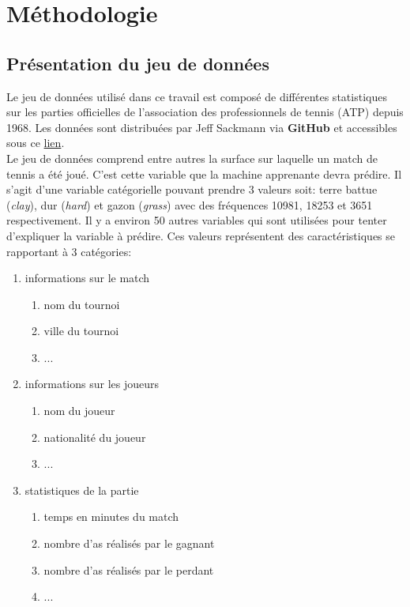 \section{Méthodologie}

\subsection{Présentation du jeu de données}
Le jeu de données utilisé dans ce travail est composé de différentes statistiques sur les parties officielles de l'association des professionnels de tennis (ATP) depuis 1968. Les données sont distribuées par Jeff Sackmann via \textbf{GitHub} et accessibles sous ce \href{https://github.com/JeffSackmann/tennis_atp}{lien}.\\

Le jeu de données comprend entre autres la surface sur laquelle un match de tennis a été joué. C'est cette variable que la machine apprenante devra prédire. Il s'agit d'une variable catégorielle pouvant prendre 3 valeurs soit: terre battue (\textit{clay}), dur (\textit{hard}) et gazon (\textit{grass}) avec des fréquences 10981, 18253 et 3651 respectivement. Il y a environ 50 autres variables qui sont utilisées pour tenter d'expliquer la variable à prédire. Ces valeurs représentent des caractéristiques se rapportant à 3 catégories:

\begin{enumerate}
  \item informations sur le match
    \begin{enumerate}
      \item nom du tournoi
      \item ville du tournoi
      \item ...
    \end{enumerate}
  \item informations sur les joueurs
    \begin{enumerate}
      \item nom du joueur
      \item nationalité du joueur
      \item ...
    \end{enumerate}
  \item statistiques de la partie
    \begin{enumerate}
      \item temps en minutes du match
      \item nombre d'as réalisés par le gagnant
      \item nombre d'as réalisés par le perdant
      \item ...
    \end{enumerate}
\end{enumerate}

